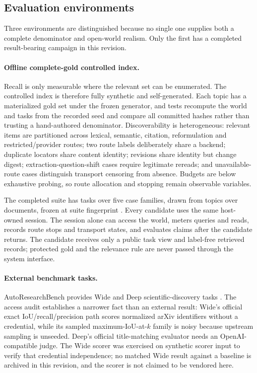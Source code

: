 \subsection{Evaluation environments}
Three environments are distinguished because no single one supplies both a
complete denominator and open-world realism.  Only the first has a completed
result-bearing campaign in this revision.

\paragraph{Offline complete-gold controlled index.}
Recall is only measurable where the relevant set can be enumerated.  The
controlled index is therefore fully synthetic and self-generated.  Each topic
has a materialized gold set under the frozen generator, and tests recompute the
world and tasks from the recorded seed and compare all committed hashes rather
than trusting a hand-authored denominator.  Discoverability is heterogeneous:
relevant items are partitioned across lexical, semantic, citation,
reformulation and restricted/provider routes; two route labels deliberately
share a backend; duplicate locators share content identity; revisions share
identity but change digest; extraction-question-shift cases require legitimate
rereads; and unavailable-route cases distinguish transport censoring from
absence.  Budgets are below exhaustive probing, so route allocation and stopping
remain observable variables.

The completed suite has \OfflineTaskCount{} tasks over five case families, drawn from \OfflineTopicCount{} topics over \OfflineDocumentCount{} documents, frozen at suite fingerprint \texttt{\OfflineSuiteFingerprintShort}.  Every candidate uses
the same host-owned session.  The session alone can access the world, meters
queries and reads, records route stops and transport states, and evaluates claims
after the candidate returns.  The candidate receives only a public task view and
label-free retrieved records; protected gold and the relevance rule are never
passed through the system interface.

\paragraph{External benchmark tasks.}
AutoResearchBench provides Wide and Deep scientific-discovery tasks
\cite{autoresearchbench2026}.  The access audit establishes a narrower fact than
an external result: Wide's official exact IoU/recall/precision path scores
normalized arXiv identifiers without a credential, while its sampled
maximum-IoU-at-$k$ family is noisy because upstream sampling is unseeded.
Deep's official title-matching evaluator needs an OpenAI-compatible judge.  The
Wide scorer was exercised on synthetic scorer input to verify that credential
independence; no matched Wide result against a baseline is archived in this
revision, and the scorer is not claimed to be vendored here.

